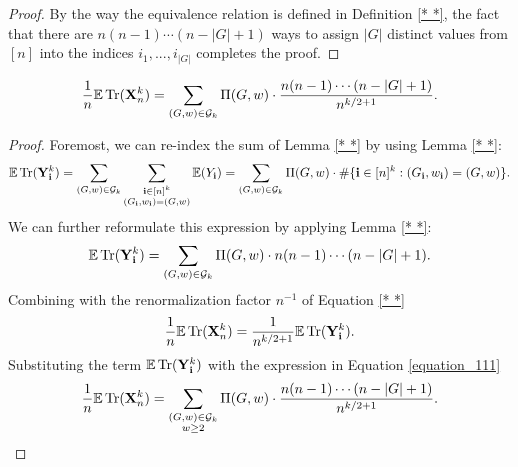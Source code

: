 \begin{proof}
  By the way the equivalence relation is defined in Definition \ref{* *}, 
  the fact that there are $n (n - 1) \cdots (n -|G| + 1)$ ways to assign $|G|$ distinct values from $[n]$ into the indices $i_1,...,i_{|G|}$ completes the proof.
\end{proof}
\begin{lemma}
  \label{lem:}
  \uses{}
  \[
  \frac{1}{n} {\mathbb{E}} \operatorname{Tr} (\mathbf{X}_n^k) = \sum_{(G,w) \in \mathcal{G}_k} \Pi (G,w) \cdot \frac{n (n-1) \cdots (n - |G| + 1)}{n^{k/2+1}}.
  \]
\end{lemma}
\begin{proof}
  Foremost, we can re-index the sum of Lemma \ref{* *} by using Lemma \ref{* *}: 
  \[ 
  {\mathbb{E}} \operatorname{Tr} (\mathbf{Y}_\mathbf{i}^k) 
  = \sum_{(G,w) \in \mathcal{G}_k} \sum_{\substack{\mathbf{i} \in [n]^k \\ (G_\mathbf{i},w_\mathbf{i}) = (G,w)}} {\mathbb{E}} (Y_\mathbf{i})
  = \sum_{(G,w) \in \mathcal{G}_k} \Pi (G,w) \cdot \# \{ \mathbf{i} \in [n]^k : (G_\mathbf{i},w_\mathbf{i}) = (G,w) \}.
  \]
  We can further reformulate this expression by applying Lemma \ref{* *}:
  \begin{equation}\label{equation_111}
  {\mathbb{E}} \operatorname{Tr} (\mathbf{Y}_\mathbf{i}^k)
  = \sum_{(G,w) \in \mathcal{G}_k} \Pi (G,w) \cdot n (n-1) \cdots (n - |G| + 1).
  \end{equation}
  Combining with the renormalization factor $n^{-1}$ of Equation \ref{* *}
  \[
  \frac{1}{n} {\mathbb{E}} \operatorname{Tr} (\mathbf{X}_n^k) = \frac{1}{n^{k/2+1}} {\mathbb{E}} \operatorname{Tr} (\mathbf{Y}_\mathbf{i}^k).
  \]
  Substituting the term ${\mathbb{E}} \operatorname{Tr} (\mathbf{Y}_\mathbf{i}^k)$ with the expression in Equation \ref{equation_111}
  \[
  \frac{1}{n} {\mathbb{E}} \operatorname{Tr} (\mathbf{X}_n^k) = \sum_{\substack{(G,w) \in \mathcal{G}_k \\ w \geq 2}} \Pi (G,w) \cdot \frac{n (n-1) \cdots (n - |G| + 1)}{n^{k/2+1}}.
  \]
\end{proof}



